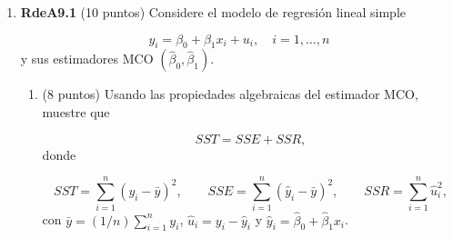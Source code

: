 \documentclass[10pt,a4paper]{article}
\begin{document}
\begin{enumerate}
{Tomando esperanza condicional en $\mathbf{x} = (x_1,\ldots,x_n)$:

\begin{align*}
E[\hat{\beta}_1 \mid \mathbf{x}]
&= E\!\left[\beta_1 + \sum_{i=1}^n w_i\,u_i \;\middle|\; \mathbf{x}\right] \\
&= \beta_1 + \sum_{i=1}^n w_i\,E[u_i \mid \mathbf{x}].
\end{align*}

En la segunda igualdad usamos que $\beta_1$ es una constante y que los $w_i$ son funciones
deterministas de $\mathbf{x}$, por lo que salen de la esperanza condicional.

Bajo el supuesto $E[u_i \mid x_i] = 0$ (y, por tanto, $E[u_i \mid \mathbf{x}] = 0$
si los errores son independientes de los regresores):
$$E[\hat{\beta}_1 \mid \mathbf{x}]
= \beta_1 + \sum_{i=1}^n w_i \cdot 0 = \beta_1.$$

\medskip
\textbf{Conclusión:} Se ha demostrado que $E[\hat{\beta}_1 \mid \mathbf{x}] = \beta_1$, es decir, el estimador MCO de la pendiente es \textbf{insesgado}. $\blacksquare$



}



    \item \textbf{RdeA9.1} (10 puntos) 
        Considere el modelo de regresión lineal simple

    $$
        y_i
        =
        \beta_0
        +
        \beta_1
        x_i
        +
        u_i
        ,
        \quad
        i
        =
        1
        ,
        \ldots
        ,
        n
    $$
    y sus estimadores MCO $(\hat \beta_0, \hat \beta_1)$.
    
    \smallskip
    \begin{enumerate}

        \item  (8 puntos) Usando las propiedades algebraicas del estimador MCO, muestre que


            $$
                SST
                =
                SSE
                +
                SSR
                \text{,}
            $$
            donde

            $$
                SST
                =
                \sum_{i=1}^n
                    \left(
                        y_i
                        -
                        \bar y
                    \right)
                    ^
                    2
                ,
                \qquad
                SSE
                =
                \sum_{i=1}^n
                    \left(
                        \hat y_i
                        -
                        \bar y
                    \right)
                    ^
                    2
                ,
                \qquad
                SSR
                =
                \sum_{i=1}^n
                    \hat u_i
                    ^
                    2
                \text{,}
            $$
            con $\bar y = ( 1 / n ) \sum_{i=1}^n y_i$, $\hat u_i = y_i - \hat y_i$ y $\hat y_i = \hat \beta_0 + \hat \beta_1 x_i$.


\end{enumerate}
\end{enumerate}
\end{document}
